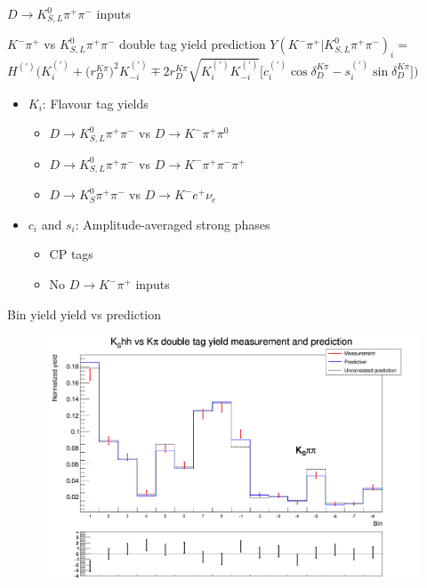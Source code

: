 \documentclass{beamer}
\begin{document}
\begin{frame}{$D\to K_{S, L}^0\pi^+\pi^-$ inputs}
  \begin{block}{$K^-\pi^+$ vs $K_{S, L}^0\pi^+\pi^-$ double tag yield prediction}
    $Y(K^-\pi^+|K_{S, L}^0\pi^+\pi^-)_i =$ \\ 
    $H^{(\prime)}\Big(K_i^{(\prime)} + \big(r_D^{K\pi}\big)^2K_{-i}^{(\prime)} \mp 2r_D^{K\pi}\sqrt{K_i^{(\prime)}K_{-i}^{(\prime)}}\big[c_i^{(\prime)}\cos\delta_D^{K\pi} - s_i^{(\prime)}\sin\delta_D^{K\pi}\big]\Big)$
  \end{block}
  \begin{itemize}
      \setlength\itemsep{1.0em}
    \item{$K_i$: Flavour tag yields}
    \begin{itemize}
      \setlength\itemsep{0.5em}
      \item{$D\to K_{S, L}^0\pi^+\pi^-$ vs $D\to K^-\pi^+\pi^0$}
      \item{$D\to K_{S, L}^0\pi^+\pi^-$ vs $D\to K^-\pi^+\pi^-\pi^+$}
      \item{$D\to K_S^0\pi^+\pi^-$ vs $D\to K^-e^+\nu_e$}
    \end{itemize}
    \item{$c_i$ and $s_i$: Amplitude-averaged strong phases}
    \begin{itemize}
      \setlength\itemsep{0.5em}
      \item{CP tags}
      \item{No $D\to K^-\pi^+$ inputs}
    \end{itemize}
  \end{itemize}
\end{frame}

\begin{frame}{Bin yield yield vs prediction}
  \begin{figure}
    \centering
    \includegraphics[width=\textwidth]{KSpipiVersusKpiYields.png}
  \end{figure}
\end{frame}
\end{document}
